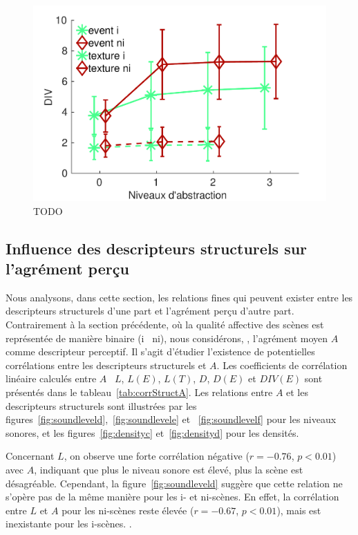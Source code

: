 \begin{figure}[t]
        \myfloatalign
        \includegraphics[width=.9\linewidth]{gfxXpUrbanSoundscape/xp1_div_1}
       \caption[TODO]{TODO}\label{fig:diversity}
\end{figure}

\subsection{Influence des descripteurs structurels sur l'agrément perçu}
\label{sec:ch5_corrDesStruct}

Nous analysons,  dans cette section, les relations fines qui peuvent exister entre les descripteurs structurels d'une part et l'agrément perçu d'autre part. Contrairement à la section précédente, où la qualité affective des scènes est représentée de manière binaire (i \vs~ni), nous considérons,  , l'agrément moyen $A$ comme descripteur perceptif. Il s'agit d'étudier l'existence de potentielles corrélations entre les descripteurs structurels et $A$. Les coefficients de corrélation linéaire calculés entre $A$ \vs~$L$, $L(E)$, $L(T)$, $D$, $D(E)$ et $DIV(E)$ sont présentés dans le tableau~\ref{tab:corrStructA}. Les relations entre $A$ et les descripteurs structurels sont illustrées par les figures~\ref{fig:soundleveld},~\ref{fig:soundlevele} et ~\ref{fig:soundlevelf} pour les niveaux sonores, et les figures~\ref{fig:densityc} et~\ref{fig:densityd} pour les densités. 

Concernant $L$, on observe une forte corrélation négative ($r=-0.76$, $p<0.01$) avec $A$, indiquant  que plus le niveau sonore est élevé, plus la scène est désagréable. Cependant, la figure~\ref{fig:soundleveld} suggère que cette relation ne s'opère pas de la même manière pour les i- et ni-scènes. En effet, la corrélation entre $L$ et $A$ pour les ni-scènes reste élevée ($r=-0.67$, $p<0.01$), mais est inexistante pour les i-scènes.  .  

